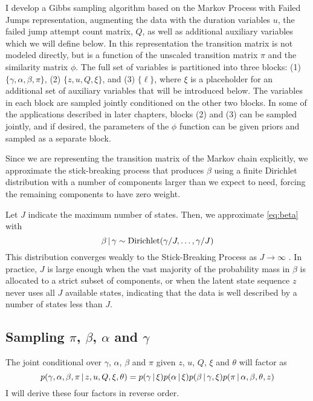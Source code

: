 I develop a Gibbs sampling algorithm based on the Markov Process with
Failed Jumps representation, augmenting the data with the duration
variables $u$, the failed jump attempt count matrix, $Q$, as well
as additional auxiliary variables which we will define below.
In this representation the transition matrix is not modeled
directly, but is a function of the unscaled transition matrix $\pi$
and the similarity matrix $\phi$.  The full set of variables is
partitioned into three blocks: (1) $\{\gamma, \alpha, \beta, \pi\}$,
(2) $\{z, u, Q, \xi\}$, and (3) $\{\ell\}$, where $\xi$
is a placeholder for an additional set of auxiliary variables that will be introduced
below.  The variables in each block are sampled jointly 
conditioned on the other two blocks.  In some of the applications
described in later chapters, blocks (2) and (3) can be sampled
jointly, and if desired, the parameters of the $\phi$ function can be
given priors and sampled as a separate block.

Since we are representing the transition matrix of the Markov chain
explicitly, we approximate the stick-breaking process that produces
$\beta$ using a finite Dirichlet distribution with a number of 
components larger than we expect to need, forcing the remaining 
components to have zero weight.  

Let $J$ indicate the maximum number of states.  Then,
we approximate \eqref{eq:beta} with
\begin{equation}
  \label{eq:28}
  \beta \, \vert \, \gamma \sim \mathrm{Dirichlet}(\gamma / J, \dots,
  \gamma / J)
\end{equation}
This distribution converges weakly to the Stick-Breaking Process as $J \to
\infty$ \cite{ishwaran2000markov}.  In practice, $J$ is large enough 
when the vast majority of the probability mass in $\beta$ is allocated 
to a strict subset of components, or when the latent state sequence 
$z$ never uses all $J$ available states, indicating that the data is 
well described by a number of states less than $J$.

\subsection{Sampling $\pi$, $\beta$, $\alpha$ and $\gamma$}
\label{sec:sampling-pi}

The joint conditional over $\gamma$, $\alpha$, $\beta$ and $\pi$
given $z$, $u$, $Q$, $\xi$ and $\theta$ will factor as
\begin{equation}
  \label{eq:46}
  p(\gamma, \alpha, \beta, \pi \, \vert \, z, u, Q, \xi, \theta) = p(\gamma \, \vert \,
  \xi) p(\alpha \, \vert \, \xi) p(\beta \, \vert \, \gamma, \xi) p(\pi
  \, \vert \, \alpha, \beta, \theta, z)
\end{equation}
I will derive these four factors in reverse order.

